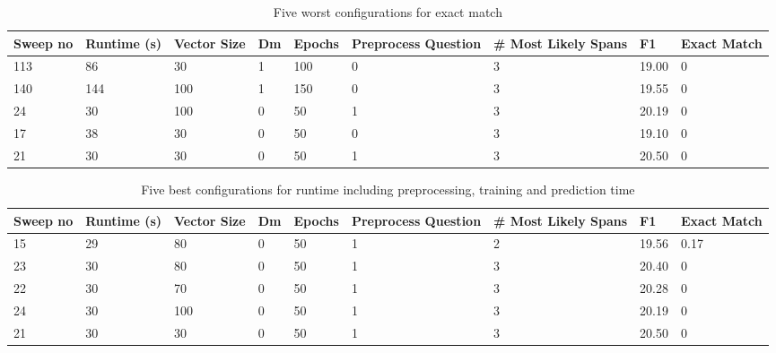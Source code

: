 \documentclass[11pt]{article}
\begin{document}
    \begin{table}[p]
        \centering
        \begin{tabularx}{\textwidth}{|X|X|X|X|X|X|X|X|X|}
            \hline
            Sweep no & Runtime (s) & Vector Size & Dm & Epochs & Preprocess Question & \# Most Likely Spans & F1 & Exact Match \\ \hline
            113      & 86          & 30          & 1  & 100    & 0                   & 3                    & 19.00 & 0           \\ \hline
            140      & 144         & 100         & 1  & 150    & 0                   & 3                    & 19.55 & 0           \\ \hline
            24       & 30          & 100         & 0  & 50     & 1                   & 3                    & 20.19 & 0           \\ \hline
            17       & 38          & 30          & 0  & 50     & 0                   & 3                    & 19.10 & 0           \\ \hline
            21       & 30          & 30          & 0  & 50     & 1                   & 3                    & 20.50 & 0           \\ \hline
        \end{tabularx}
        \caption{Five worst configurations for exact match}
        \label{table:5-worst-exact}
    \end{table}

    \begin{table}[p]
        \centering
        \begin{tabularx}{\textwidth}{|X|X|X|X|X|X|X|X|X|}
            \hline
            Sweep no & Runtime (s) & Vector Size & Dm & Epochs & Preprocess Question & \# Most Likely Spans & F1 & Exact Match \\ \hline
            15       & 29          & 80          & 0  & 50     & 1                   & 2                    & 19.56 & 0.17        \\ \hline
            23       & 30          & 80          & 0  & 50     & 1                   & 3                    & 20.40 & 0           \\ \hline
            22       & 30          & 70          & 0  & 50     & 1                   & 3                    & 20.28 & 0           \\ \hline
            24       & 30          & 100         & 0  & 50     & 1                   & 3                    & 20.19 & 0           \\ \hline
            21       & 30          & 30          & 0  & 50     & 1                   & 3                    & 20.50 & 0           \\ \hline
        \end{tabularx}
        \caption{Five best configurations for runtime including preprocessing, training and prediction time}
        \label{table:5-best-runtime}
    \end{table}
\end{document}
